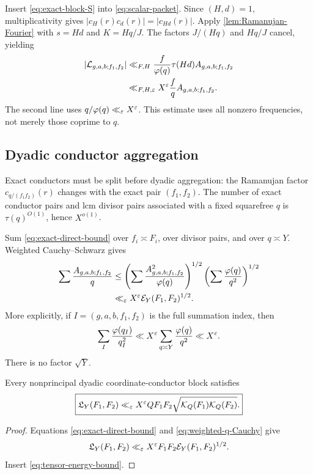 Insert \eqref{eq:exact-block-S} into \eqref{eq:scalar-packet}.  Since
\((H,d)=1\), multiplicativity gives
\(|c_H(r)c_d(r)|=|c_{Hd}(r)|\).  Apply
\cref{lem:Ramanujan-Fourier} with \(s=Hd\) and \(K=Hq/J\).  The factors
\(J/(Hq)\) and \(Hq/J\) cancel, yielding
\begin{align}
 |\mathcal L_{g,a,b;f_1,f_2}|
 &\ll_{F,H}\frac f{\varphi(q)}\tau(Hd)
 A_{g,a,b;f_1,f_2}\notag\\
 &\ll_{F,H,\varepsilon}X^\varepsilon \frac fq
 A_{g,a,b;f_1,f_2}.
 \label{eq:exact-direct-bound}
\end{align}
The second line uses \(q/\varphi(q)\ll_\varepsilon X^\varepsilon\).  This estimate
uses all nonzero frequencies, not merely those coprime to \(q\).

\subsection{Dyadic conductor aggregation}

Exact conductors must be split before dyadic aggregation: the
Ramanujan factor \(c_{q/(f_1f_2)}(r)\) changes with the exact pair
\((f_1,f_2)\).  The number of exact conductor pairs and lcm divisor
pairs associated with a fixed squarefree \(q\) is
\(\tau(q)^{O(1)}\), hence \(X^{o(1)}\).

Sum \eqref{eq:exact-direct-bound} over
\(f_i\asymp F_i\), over divisor pairs, and over \(q\asymp Y\).
Weighted Cauchy--Schwarz gives
\begin{align}
 \sum \frac{A_{g,a,b;f_1,f_2}}q
 &\le
 \left(\sum \frac{A_{g,a,b;f_1,f_2}^2}{\varphi(q)}\right)^{1/2}
 \left(\sum \frac{\varphi(q)}{q^2}\right)^{1/2}\notag\\
 &\ll_\varepsilon X^\varepsilon\mathcal E_Y(F_1,F_2)^{1/2}.
 \label{eq:weighted-q-Cauchy}
\end{align}
More explicitly, if \(I=(g,a,b,f_1,f_2)\) is the full summation index,
then
\[
 \sum_I\frac{\varphi(q_I)}{q_I^2}
 \ll X^\varepsilon\sum_{q\asymp Y}\frac{\varphi(q)}{q^2}
 \ll X^\varepsilon.
\]
There is no factor \(\sqrt Y\).

\begin{theorem}
\label{thm:direct-Gauss-bound}
Every nonprincipal dyadic coordinate-conductor block satisfies
\begin{equation}
 \boxed{
 \mathfrak L_Y(F_1,F_2)
 \ll_\varepsilon X^\varepsilon QF_1F_2
 \sqrt{\mathcal K_Q(F_1)\mathcal K_Q(F_2)}.}
 \label{eq:direct-Gauss-bound}
\end{equation}
\end{theorem}

\begin{proof}
Equations \eqref{eq:exact-direct-bound} and
\eqref{eq:weighted-q-Cauchy} give
\[
 \mathfrak L_Y(F_1,F_2)
 \ll_\varepsilon X^\varepsilon F_1F_2\mathcal E_Y(F_1,F_2)^{1/2}.
\]
Insert \eqref{eq:tensor-energy-bound}.
\end{proof}

